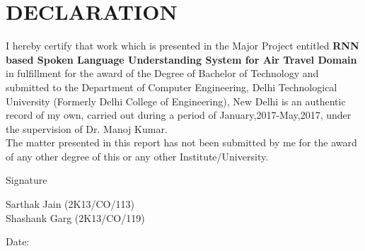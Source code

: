 \chapter*{DECLARATION}
\linespread{1.6}


\normalsize I hereby certify that work which is presented in the Major Project entitled \textbf{RNN based Spoken Language Understanding System for Air Travel Domain} in fulfillment for the award of the Degree of Bachelor of Technology and submitted to the Department of Computer Engineering, Delhi Technological University (Formerly Delhi College of Engineering), New Delhi is an authentic record of my own, carried out during a period of January,2017-May,2017, under the supervision of Dr. Manoj Kumar.
\\
The matter presented in this report has not been submitted by me for the award of any other degree of this or any other Institute/University. \\
[1.0cm]





\begin{flushright}
	Signature \\ 
\end{flushright}
\begin{flushleft}
	Sarthak Jain (2K13/CO/113)  \\ 
	Shashank Garg (2K13/CO/119)  \\
\end{flushleft}

\begin{flushleft}
	Date:
\end{flushleft}

